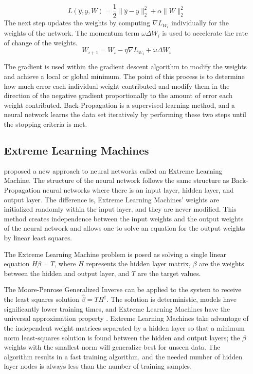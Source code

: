\documentclass{ncjms}
\begin{document}
	\begin{equation}
		L(\hat{y},y,W)=\dfrac{1}{2} \lVert \hat{y}-y \rVert_{2}^{2} + \alpha \lVert W \rVert_{2}^{2}
		\end{equation}
		The next step updates the weights by computing $\nabla L_{W_i}$ individually for the weights of the network.
		The momentum term $\omega \Delta W_i$ is used to accelerate the rate of change of the weights.
		\begin{equation}
		W_{i+1}=W_i - \eta \nabla L_{W_{i}} + \omega \Delta W_i
	\end{equation}

	The gradient is used within the gradient descent algorithm to modify the weights and achieve a local or global minimum.
	The point of this process is to determine how much error each individual weight contributed and modify them in the direction of the negative gradient proportionally to the amount of error each weight contributed.
	Back-Propagation is a supervised learning method, and a neural network learns the data set iteratively by performing these two steps until the stopping criteria is met.

	\subsection{Extreme Learning Machines}\label{subsec:extreme-learning-machines}
	\citet{Huang:2006} proposed a new approach to neural networks called an Extreme Learning Machine.
	The structure of the neural network follows the same structure as Back-Propagation neural networks where there is an input layer, hidden layer, and output layer.
	The difference is, Extreme Learning Machines' weights are initialized randomly within the input layer, and they are never modified.
	This method creates independence between the input weights and the output weights of the neural network and allows one to solve an equation for the output weights by linear least squares.

	The Extreme Learning Machine problem is posed as solving a single linear equation $H \beta = T$, where $H$ represents the hidden layer matrix, $\beta$ are the weights between the hidden and output layer, and $T$ are the target values.

	The Moore-Penrose Generalized Inverse can be applied to the system to receive the least squares solution $\hat{\beta} = T {H}^\dagger$.
	The solution is deterministic, models have significantly lower training times, and Extreme Learning Machines have the universal approximation property \citet{Huang2:2006}.
	Extreme Learning Machines take advantage of the independent weight matrices separated by a hidden layer so that a minimum norm least-squares solution is found between the hidden and output layers; the $\beta $ weights with the smallest norm will generalize best for unseen data.
	The algorithm results in a fast training algorithm, and the needed number of hidden layer nodes is always less than the number of training samples.
\end{document}

